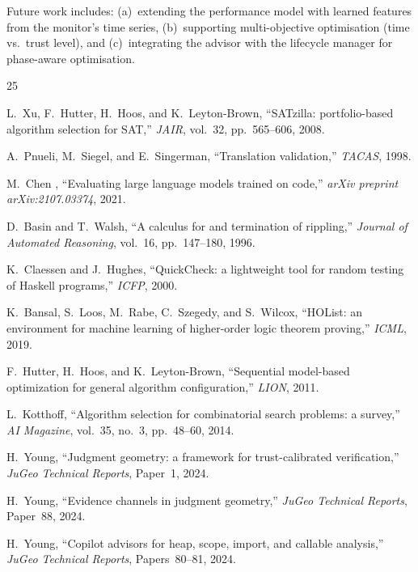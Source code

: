 \documentclass[11pt]{article}
\begin{document}
Future work includes: (a)~extending the performance
model with learned features from the monitor's time
series, (b)~supporting multi-objective optimisation
(time vs.\ trust level), and (c)~integrating the
advisor with the lifecycle manager for phase-aware
optimisation.

\begin{thebibliography}{25}

L.~Xu, F.~Hutter, H.~Hoos, and K.~Leyton-Brown,
``SATzilla: portfolio-based algorithm selection for SAT,''
\emph{JAIR}, vol.~32, pp.~565--606, 2008.

A.~Pnueli, M.~Siegel, and E.~Singerman,
``Translation validation,''
\emph{TACAS}, 1998.

M.~Chen \etal{},
``Evaluating large language models trained on code,''
\emph{arXiv preprint arXiv:2107.03374}, 2021.

D.~Basin and T.~Walsh,
``A calculus for and termination of rippling,''
\emph{Journal of Automated Reasoning}, vol.~16,
pp.~147--180, 1996.

K.~Claessen and J.~Hughes,
``QuickCheck: a lightweight tool for random testing of
Haskell programs,''
\emph{ICFP}, 2000.

K.~Bansal, S.~Loos, M.~Rabe, C.~Szegedy, and S.~Wilcox,
``HOList: an environment for machine learning of higher-order
logic theorem proving,''
\emph{ICML}, 2019.

F.~Hutter, H.~Hoos, and K.~Leyton-Brown,
``Sequential model-based optimization for general algorithm
configuration,''
\emph{LION}, 2011.

L.~Kotthoff,
``Algorithm selection for combinatorial search problems:
a survey,''
\emph{AI Magazine}, vol.~35, no.~3, pp.~48--60, 2014.

H.~Young,
``Judgment geometry: a framework for trust-calibrated
verification,''
\emph{JuGeo Technical Reports}, Paper~1, 2024.

H.~Young,
``Evidence channels in judgment geometry,''
\emph{JuGeo Technical Reports}, Paper~88, 2024.

H.~Young,
``Copilot advisors for heap, scope, import, and callable
analysis,''
\emph{JuGeo Technical Reports}, Papers~80--81, 2024.


\end{thebibliography}
\end{document}
